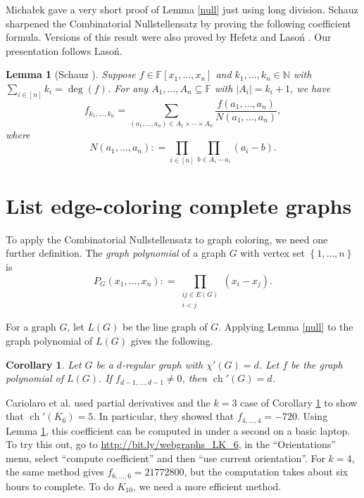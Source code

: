 \documentclass[12pt]{article}
\theoremstyle{plain}
\newtheorem{lem}[thm]{Lemma}
\newtheorem{cor}[thm]{Corollary}
\theoremstyle{definition}
\theoremstyle{remark}
\newcommand{\IN}{\mathbb{N}}
\newcommand{\set}[1]{\left\{ #1 \right\}}
\newcommand{\card}[1]{\left|#1\right|}
\newcommand{\irange}[1]{\left[#1\right]}
\newcommand{\DefinedAs}{\mathrel{\mathop:}=}
\newcommand{\ch}{\operatorname{ch}}
\begin{document}
Micha{\l}ek \cite{michalek} gave a very short proof of Lemma \ref{null} just using long division.  Schauz \cite{schauz2008algebraically} sharpened the Combinatorial Nullstellensatz by proving the following coefficient formula.  Versions of this result were also proved by Hefetz \cite{hefetz2011two} and Laso{\'n} \cite{lason2010generalization}. Our presentation follows Laso{\'n}.

\begin{lem}[Schauz \cite{schauz2008algebraically}]\label{nullCoefficient}
Suppose $f \in \mathbb{F}[x_1, \ldots, x_n]$ and $k_1, \ldots, k_n \in \IN$ with $\sum_{i \in \irange{n}} k_i = \deg(f)$.  For any $A_1, \ldots, A_n \subseteq \mathbb{F}$ with $\card{A_i} = k_i + 1$, we have
\[f_{k_1, \ldots, k_n} = \sum_{(a_1, \ldots, a_n) \in A_1 \times \cdots \times A_n} \frac{f(a_1, \ldots, a_n)}{N(a_1, \ldots, a_n)},\]
where
\[N(a_1, \ldots, a_n) \DefinedAs \prod_{i \in \irange{n}} \prod_{b \in A_i - a_i} (a_i - b).\]
\end{lem}

\section{List edge-coloring complete graphs}
To apply the Combinatorial Nullstellensatz to graph coloring, we need one further definition. The \emph{graph polynomial} of a graph $G$ with vertex set $\set{1,\ldots, n}$ is 
\[P_G(x_1, \ldots, x_n) \DefinedAs \prod_{\substack{ij \in E(G)\\i<j}} (x_i - x_j).\]

For a graph $G$, let $L(G)$ be the line graph of $G$. Applying Lemma \ref{null} to the graph polynomial of $L(G)$ gives the following.
\begin{cor}\label{simplified}
Let $G$ be a $d$-regular graph with $\chi'(G) = d$. Let $f$ be the graph polynomial of $L(G)$.  If $f_{d-1, \ldots, d-1} \ne 0$, then $\ch'(G) = d$.
\end{cor}

Cariolaro et al. used partial derivatives and the $k=3$ case of Corollary \ref{simplified} to show that $\ch'(K_6) = 5$.  In particular, they showed that $f_{4,\ldots, 4} = -720$.  Using Lemma \ref{nullCoefficient}, this coefficient can be computed in under a second on a basic laptop. To try this out, go to \url{http://bit.ly/webgraphs_LK_6}, in the ``Orientations'' menu, select ``compute coefficient'' and then ``use current orientation''.  For $k=4$, the same method gives $f_{6,\ldots,6} = 21772800$, but the computation takes about six hours to complete.  To do $K_{10}$, we need a more efficient method.
\end{document}
